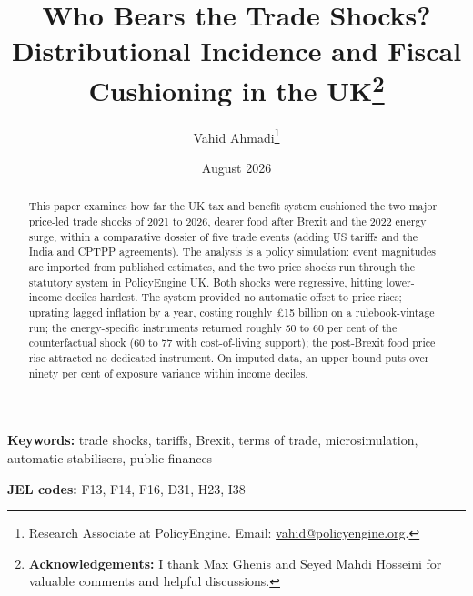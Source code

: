\documentclass[11pt]{article}
\title{\Large\bfseries Who Bears the Trade Shocks?\\[0.15cm] Distributional Incidence and Fiscal Cushioning in the UK\thanks{\textbf{Acknowledgements:} I thank Max Ghenis and Seyed Mahdi Hosseini for valuable comments and helpful discussions.}\\[0.7cm]}
\author{Vahid Ahmadi\thanks{Research Associate at PolicyEngine. Email: \href{mailto:vahid@policyengine.org}{vahid@policyengine.org}.}}
\date{\small August 2026}
\begin{document}
\maketitle

\begin{abstract}
\noindent This paper examines how far the UK tax and benefit system
cushioned the two major price-led trade shocks of 2021 to 2026,
dearer food after Brexit and the 2022 energy surge, within a comparative
dossier of five trade events (adding US tariffs and the India and
CPTPP agreements). The analysis is a policy simulation:
event magnitudes are imported from published estimates, and the two
price shocks run through the statutory system in PolicyEngine UK. Both shocks were regressive,
hitting lower-income deciles hardest. The system provided no automatic offset to
price rises; uprating lagged inflation by a year, costing roughly
\pounds 15 billion on a rulebook-vintage run; the energy-specific
instruments returned roughly 50 to 60 per cent of the counterfactual
shock (60 to 77 with cost-of-living support); the
post-Brexit food price rise attracted no dedicated instrument. On imputed data, an upper
bound puts over ninety per cent of exposure variance within income
deciles.
\end{abstract}

\medskip
\noindent\textbf{Keywords:} trade shocks, tariffs, Brexit, terms of trade, microsimulation, automatic stabilisers, public finances

\smallskip
\noindent\textbf{JEL codes:} F13, F14, F16, D31, H23, I38

\newpage









\clearpage

\end{document}
